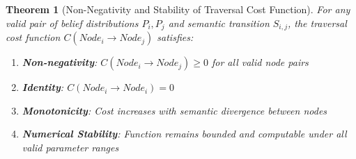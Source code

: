 \documentclass[11pt,a4paper]{article}
\newtheorem{theorem}{Theorem}
\begin{document}
\begin{theorem}[Non-Negativity and Stability of Traversal Cost Function]
For any valid pair of belief distributions $P_i, P_j$ and semantic transition $S_{i,j}$, the traversal cost function $C(Node_i \rightarrow Node_j)$ satisfies:
\begin{enumerate}
    \item \textbf{Non-negativity}: $C(Node_i \rightarrow Node_j) \geq 0$ for all valid node pairs
    \item \textbf{Identity}: $C(Node_i \rightarrow Node_i) = 0$ 
    \item \textbf{Monotonicity}: Cost increases with semantic divergence between nodes
    \item \textbf{Numerical Stability}: Function remains bounded and computable under all valid parameter ranges
\end{enumerate}
\end{theorem}
\end{document}
